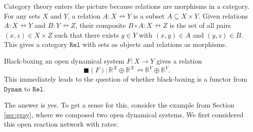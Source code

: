\documentclass{compositionalityarticle}
\newcommand{\R}{\mathbb{R}}
\newcommand{\Dynam}{\mathtt{Dynam}}
\newcommand{\Rel}{\mathtt{Rel}}
\newcommand{\maps}{\colon}
\newcommand{\relto}{\nrightarrow}
\theoremstyle{plain}
\theoremstyle{remark}
\begin{document}
Category theory enters the picture because relations are morphisms in a category.  For any sets $X$ and $Y$, a relation $A \maps X \relto Y$ is a subset $A \subseteq X \times Y$.   Given relations $A \maps X \relto Y$ and $B \maps Y \relto Z$, their composite $B \circ A \maps X \relto Z$ is the set of all pairs $(x,z) \in X \times Z$ such that there exists $y \in Y$ with $(x,y) \in A$ and $(y,z) \in B$.   This gives a category $\Rel$ with sets as objects and relations as morphisms.   

Black-boxing an open dynamical system $F \maps X \to Y$ gives a relation
\[   \blacksquare(F) \maps \R^X \oplus \R^X \relto \R^Y \oplus \R^Y  .\]
This immediately leads to the question of whether black-boxing is a functor from $\Dynam$ to 
$\Rel$.  

The answer is yes.  To get a sense for this, consider the example from Section \ref{sec:gray}, where we composed two open dynamical systems.   We first considered this open reaction network with rates:
\end{document}
